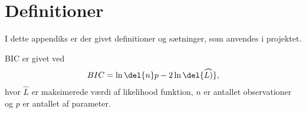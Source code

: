 \chapter{Definitioner}
I dette appendiks er der givet definitioner og sætninger, som anvendes i projektet.

\begin{defn}\label{def:bic}
BIC er givet ved
\begin{align*}
BIC = \ln\del{n}p - 2 \ln\del{\widehat{L)}}, \label{eq:bic}
\end{align*}
hvor $\widehat{L}$ er maksimerede værdi af likelihood funktion, $n$ er antallet observationer og $p$ er antallet af parameter.
\end{defn} 